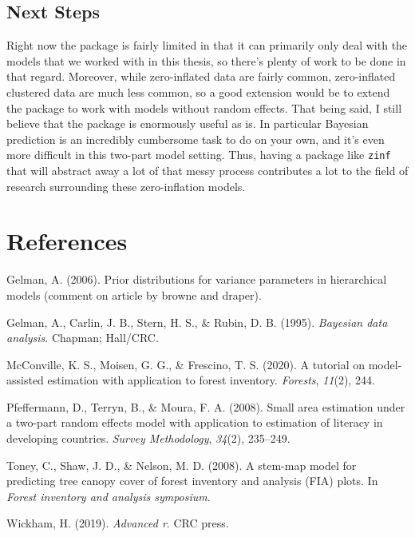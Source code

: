 \documentclass[12pt,twoside]{reedthesis}
\newlength{\cslhangindent}
\newenvironment{CSLReferences}[2] %
 {%
  \setlength{\parindent}{0pt}
  \ifodd #1 \everypar{\setlength{\hangindent}{\cslhangindent}}\ignorespaces\fi
  \ifnum #2 > 0
  \setlength{\parskip}{#2\baselineskip}
  \fi
 }%
 {}
\begin{document}
\hypertarget{next-steps}{%
\section{Next Steps}\label{next-steps}}

Right now the package is fairly limited in that it can primarily only deal with the models that we worked with in this thesis, so there's plenty of work to be done in that regard. Moreover, while zero-inflated data are fairly common, zero-inflated clustered data are much less common, so a good extension would be to extend the package to work with models without random effects. That being said, I still believe that the package is enormously useful as is. In particular Bayesian prediction is an incredibly cumbersome task to do on your own, and it's even more difficult in this two-part model setting. Thus, having a package like \texttt{zinf} that will abstract away a lot of that messy process contributes a lot to the field of research surrounding these zero-inflation models.

\backmatter

\hypertarget{references}{%
\chapter*{References}\label{references}}


\noindent

\setlength{\parindent}{-0.20in}

\hypertarget{refs}{}
\begin{CSLReferences}{1}{0}
\leavevmode{}%
Gelman, A. (2006). Prior distributions for variance parameters in hierarchical models (comment on article by browne and draper).

\leavevmode{}%
Gelman, A., Carlin, J. B., Stern, H. S., \& Rubin, D. B. (1995). \emph{Bayesian data analysis}. Chapman; Hall/CRC.

\leavevmode{}%
McConville, K. S., Moisen, G. G., \& Frescino, T. S. (2020). A tutorial on model-assisted estimation with application to forest inventory. \emph{Forests}, \emph{11}(2), 244.

\leavevmode{}%
Pfeffermann, D., Terryn, B., \& Moura, F. A. (2008). Small area estimation under a two-part random effects model with application to estimation of literacy in developing countries. \emph{Survey Methodology}, \emph{34}(2), 235--249.

\leavevmode{}%
Toney, C., Shaw, J. D., \& Nelson, M. D. (2008). A stem-map model for predicting tree canopy cover of forest inventory and analysis (FIA) plots. In \emph{Forest inventory and analysis symposium}.

\leavevmode{}%
Wickham, H. (2019). \emph{Advanced r}. CRC press.

\end{CSLReferences}

\end{document}
